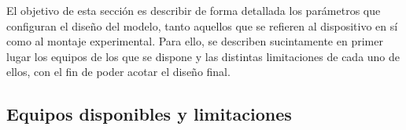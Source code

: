 El objetivo de esta sección es describir de forma detallada los parámetros que configuran el diseño del modelo, tanto aquellos que se refieren al dispositivo en sí como al montaje experimental. Para ello, se describen sucintamente en primer lugar los equipos de los que se dispone y las distintas limitaciones de cada uno de ellos, con el fin de poder acotar el diseño final.

\subsection{Equipos disponibles y limitaciones}



%





\captionsetup[figure]{textformat=period}
\endinput

